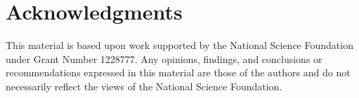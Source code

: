 \section{Acknowledgments}
This material is based upon work supported by the National Science
Foundation under Grant Number 1228777. Any opinions, findings,
and conclusions or recommendations expressed in this material are
those of the authors and do not necessarily reflect the views of the
National Science Foundation.